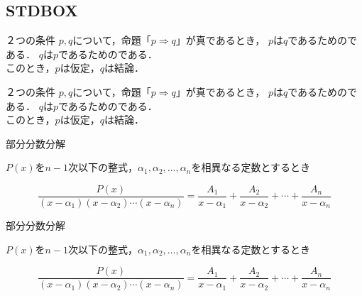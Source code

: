 \documentclass[../main]{subfiles}
\begin{document}
\leaderfill

\subsection{STDBOX}
\begin{STDBOX}{}
    ２つの条件 $p,q$について，命題「$p \Rightarrow q$」が真であるとき，
    $p$は$q$であるためのである．
    $q$は$p$であるためのである． \\
    このとき，$p$は仮定，$q$は結論．
\end{STDBOX}
\begin{code}[language=tex]
\begin{STDBOX}{}
    ２つの条件 $p,q$について，命題「$p \Rightarrow q$」が真であるとき，
    $p$は$q$であるためのである．
    $q$は$p$であるためのである． \\
    このとき，$p$は仮定，$q$は結論．
\end{STDBOX}
\end{code}

\leaderfill

\begin{STDBOX}{部分分数分解}

$P(x)$を$n-1$次以下の整式，$\alpha_1,\alpha_2,\ldots,\alpha_n$を相異なる定数とするとき

\begin{equation*}
    \frac{P(x)}{(x-\alpha_1)(x-\alpha_2)\cdots(x-\alpha_n)}
    = \frac{A_1}{x-\alpha_1} + \frac{A_2}{x-\alpha_2} + \cdots + \frac{A_n}{x-\alpha_n}
\end{equation*}

\end{STDBOX}
\begin{code}[language=tex]
\begin{STDBOX}{部分分数分解}

    $P(x)$を$n-1$次以下の整式，$\alpha_1,\alpha_2,\ldots,\alpha_n$を相異なる定数とするとき
    
    \begin{equation*}
        \frac{P(x)}{(x-\alpha_1)(x-\alpha_2)\cdots(x-\alpha_n)}
        = \frac{A_1}{x-\alpha_1} + \frac{A_2}{x-\alpha_2} + \cdots + \frac{A_n}{x-\alpha_n}
    \end{equation*}
    
\end{STDBOX}
\end{code}

\leaderfill
\end{document}
